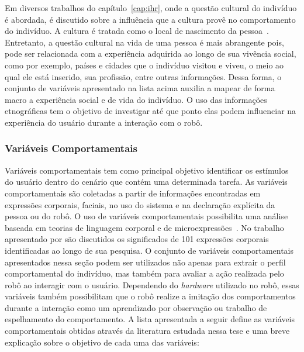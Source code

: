 Em diversos trabalhos do capítulo~\ref{cap:ihr}, onde a questão cultural do indivíduo é abordada, é discutido sobre a influência que a cultura provê no comportamento do indivíduo. A cultura é tratada como o local de nascimento da pessoa~\cite{eresha:2013}. Entretanto, a questão cultural na vida de uma pessoa é mais abrangente pois, pode ser relacionada com a experiência adquirida ao longo de sua vivência social, como por exemplo, países e cidades que o indivíduo visitou e viveu, o meio ao qual ele está inserido, sua profissão, entre outras informações. Dessa forma, o conjunto de variáveis apresentado na lista acima auxilia a mapear de forma macro a experiência social e de vida do indivíduo. O uso das informações etnográficas tem o objetivo de investigar até que ponto elas podem influenciar na experiência do usuário durante a interação com o robô.

\subsubsection{Variáveis Comportamentais}
\label{sec:reacoes}
Variáveis comportamentais tem como principal objetivo identificar os estímulos do usuário dentro do cenário que contém uma determinada tarefa. As variáveis comportamentais são coletadas a partir de informações encontradas em expressões corporais, faciais, no uso do sistema e na declaração explícita da pessoa ou do robô. O uso de variáveis comportamentais possibilita uma análise baseada em teorias de linguagem corporal e de microexpressões~\cite{lambert:2008}. No trabalho apresentado por \textcite{lambert:2008} são discutidos os significados de 101 expressões corporais identificadas ao longo de sua pesquisa. O conjunto de variáveis comportamentais apresentados nessa seção podem ser utilizados não apenas para extrair o perfil comportamental do indivíduo, mas também para avaliar a ação realizada pelo robô ao interagir com o usuário. Dependendo do \emph{hardware} utilizado no robô, essas variáveis também possibilitam que o robô realize a imitação dos comportamentos durante a interação como um aprendizado por observação ou trabalho de espelhamento do comportamento. A lista apresentada a seguir define as variáveis comportamentais obtidas através da literatura estudada nessa tese e uma breve explicação sobre o objetivo de cada uma das variáveis:

